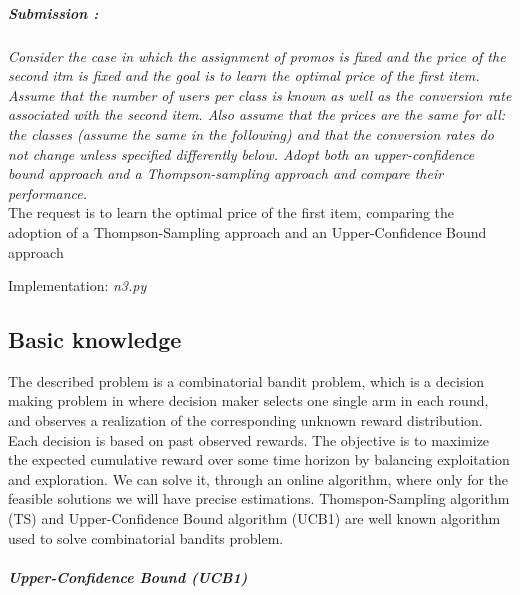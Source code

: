 \subparagraph*{Submission : }
\textit{Consider the case in which the assignment of promos is fixed and the price of the second itm is fixed and the goal is to learn the optimal price of the first item. Assume that the number of users per class is known as well as the conversion rate associated with the second item. Also assume that the prices are the same for all: the classes (assume the same in the following) and that the conversion rates do not change unless specified differently below. Adopt both an upper-confidence bound approach and a Thompson-sampling approach and compare their performance.}\\

The request is to learn the optimal price of the first item, comparing the adoption of a Thompson-Sampling approach and an Upper-Confidence Bound approach

Implementation: \textit{n3.py}
\subsection*{Basic knowledge}
The described problem is a combinatorial bandit problem, which is a decision making problem in where decision maker selects one single arm in each round, and observes a realization of the corresponding unknown reward distribution. Each decision is based on past observed rewards. The objective is to maximize the expected cumulative reward over some time horizon by balancing exploitation and exploration. We can solve it, through an online algorithm, where only for the feasible solutions we will have precise estimations. Thomspon-Sampling algorithm (TS) and Upper-Confidence Bound algorithm (UCB1) are well known algorithm used to solve combinatorial bandits problem.

\subparagraph*{Upper-Confidence Bound (UCB1)}

